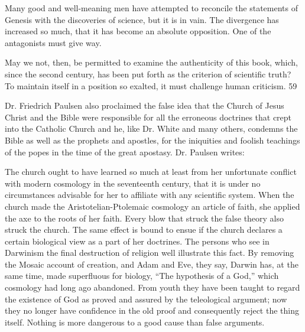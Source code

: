 Many good and well-meaning men have attempted to reconcile the statements of Genesis
with the discoveries of science, but it is in vain. The divergence has increased so much, that it
has become an absolute opposition. One of the antagonists must give way.

May we not, then, be permitted to examine the authenticity of this book, which, since the
second century, has been put forth as the criterion of scientific truth? To maintain itself in a
position so exalted, it must challenge human criticism. 59

Dr. Friedrich Paulsen also proclaimed the false idea that the Church of Jesus Christ and the
Bible were responsible for all the erroneous doctrines that crept into the Catholic Church and
he, like Dr. White and many others, condemns the Bible as well as the prophets and apostles,
for the iniquities and foolish teachings of the popes in the time of the great apostasy. Dr.
Paulsen writes:

The church ought to have learned so much at least from her unfortunate conflict with modern
cosmology in the seventeenth century, that it is under no circumstances advisable for her to
affiliate with any scientific system. When the church made the Aristotelian-Ptolemaic
cosmology an article of faith, she applied the axe to the roots of her faith. Every blow that
struck the false theory also struck the church. The same effect is bound to ensue if the church
declares a certain biological view as a part of her doctrines. The persons who see in
Darwinism the final destruction of religion well illustrate this fact. By removing the Mosaic
account of creation, and Adam and Eve, they say, Darwin has, at the same time, made
superfluous for biology, ``The hypothesis of a God,'' which cosmology had long ago
abandoned. From youth they have been taught to regard the existence of God as proved and
assured by the teleological argument; now they no longer have confidence in the old proof
and consequently reject the thing itself. Nothing is more dangerous to a good cause than false
arguments.

